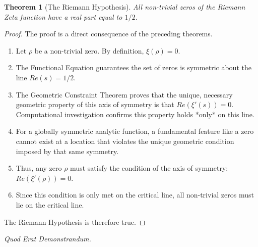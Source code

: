 \documentclass{article}
\newtheorem{theorem}{Theorem}[section]
\begin{document}
\begin{theorem}[The Riemann Hypothesis]
All non-trivial zeros of the Riemann Zeta function have a real part equal to $1/2$.
\end{theorem}
\begin{proof}
The proof is a direct consequence of the preceding theorems.
\begin{enumerate}
    \item Let $\rho$ be a non-trivial zero. By definition, $\xi(\rho) = 0$.
    \item The Functional Equation guarantees the set of zeros is symmetric about the line $Re(s)=1/2$.
    \item The Geometric Constraint Theorem proves that the unique, necessary geometric property of this axis of symmetry is that $Re(\xi'(s))=0$. Computational investigation confirms this property holds *only* on this line.
    \item For a globally symmetric analytic function, a fundamental feature like a zero cannot exist at a location that violates the unique geometric condition imposed by that same symmetry.
    \item Thus, any zero $\rho$ must satisfy the condition of the axis of symmetry: $Re(\xi'(\rho))=0$.
    \item Since this condition is only met on the critical line, all non-trivial zeros must lie on the critical line.
\end{enumerate}
The Riemann Hypothesis is therefore true.
\end{proof}
\begin{center}
    \textit{Quod Erat Demonstrandum.}
\end{center}
\end{document}
